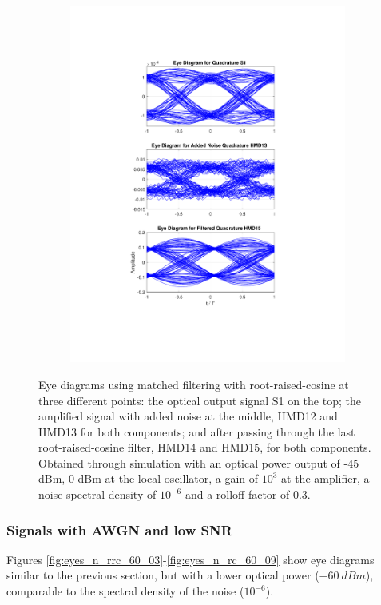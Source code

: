 \begin{figure}[H]
\begin{subfigure}{.45\textwidth}
		\includegraphics[clip, trim=5cm 4cm 5cm 4cm, width=\textwidth]{./sdf/m_qam_system/figures/eyes/q_p_45_03.pdf}
	\end{subfigure}
	
	\caption{Eye diagrams using matched filtering with root-raised-cosine
		at three different points: the optical output signal S1 on the top; the
		amplified signal with added noise at the middle, HMD12 and HMD13 for both
		components; and after passing through the last root-raised-cosine filter, HMD14
		and HMD15, for both components. Obtained through simulation with an optical
		power output of -45 dBm, 0 dBm at the local oscillator, a gain of $10^3$ at the
		amplifier, a noise spectral density of $10^{-6}$ and a rolloff factor of
		0.3.\label{fig:eyes_n_rrc_45_03}}
	
\end{figure}



\subsubsection*{Signals with AWGN and low SNR}
Figures \ref{fig:eyes_n_rrc_60_03}-\ref{fig:eyes_n_rc_60_09} show eye
diagrams similar to the previous section, but with a lower optical power ($-60~dBm$),
comparable to the spectral density of the noise ($10^{-6}$).



